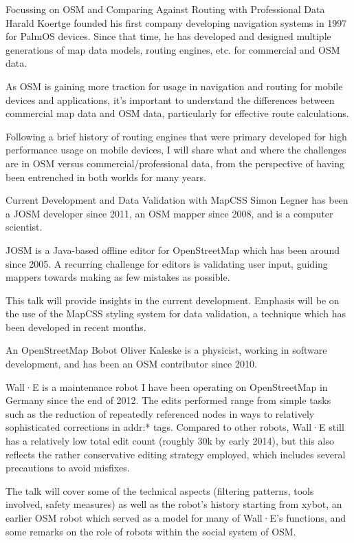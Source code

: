 %
{Focussing on OSM and Comparing Against Routing with Professional Data}%
{Harald Koertge founded his first company developing navigation systems in 1997 for PalmOS devices. Since that time, he has developed and designed multiple generations of map data models, routing engines, etc. for commercial and OSM data.}%
{As OSM is gaining more traction for usage in navigation and routing for mobile devices and applications, it’s important to understand the differences between commercial map data and OSM data, particularly for effective route calculations. 

Following a brief history of routing engines that were primary developed for high performance usage on mobile devices, I will share what and where the challenges are in OSM versus commercial/professional data, from the perspective of having been entrenched in both worlds for many years.}

%
{Current Development and Data Validation with MapCSS}%
{Simon Legner has been a JOSM developer since 2011, an OSM mapper since 2008, and is a computer scientist.}%
{JOSM is a Java-based offline editor for OpenStreetMap which has been around since 2005. A recurring challenge for editors is validating user input, guiding mappers towards making as few mistakes as possible.

This talk will provide insights in the current development. Emphasis will be on the use of the MapCSS styling system for data validation, a technique which has been developed in recent months.}

%
{An OpenStreetMap Bobot}%
{Oliver Kaleske is a physicist, working in software development, and has been an OSM contributor since 2010.}%
{Wall·E is a maintenance robot I have been operating on OpenStreetMap in Germany since the end of 2012. The edits performed range from simple tasks such as the reduction of repeatedly referenced nodes in
ways to relatively sophisticated corrections in addr:* tags. Compared to other robots, Wall·E still has a relatively low total edit count (roughly 30k by early 2014), but this also
reflects the rather conservative editing strategy employed, which includes several precautions to avoid misfixes.

The talk will cover some of the technical aspects (filtering patterns, tools involved, safety measures) as well as the robot's history starting from xybot, an earlier OSM robot which served as
a model for many of Wall·E's functions, and some remarks on the role of robots within the social system of OSM.}

